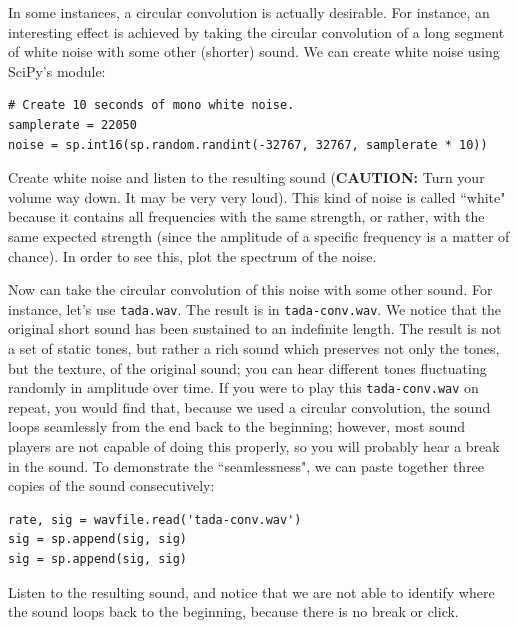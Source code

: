 In some instances, a circular convolution is actually desirable.
For instance, an interesting effect is achieved by taking the circular convolution of a long segment of white noise with some other (shorter) sound.
We can create white noise using SciPy's  module:
\begin{lstlisting}
# Create 10 seconds of mono white noise.
samplerate = 22050
noise = sp.int16(sp.random.randint(-32767, 32767, samplerate * 10))
\end{lstlisting}

\begin{problem}
Create white noise and listen to the resulting sound (\textbf{CAUTION:} Turn your volume way down. It may be very very loud). 
This kind of noise is called ``white" because it contains all frequencies with the same strength, or rather, with the same expected strength (since the amplitude of a specific frequency is a matter of chance).
In order to see this, plot the spectrum of the noise.
\end{problem}

Now can take the circular convolution of this noise with some other sound.
For instance, let's use \texttt{tada.wav}.
The result is in \texttt{tada-conv.wav}.
We notice that the original short sound has been sustained to an indefinite length.
The result is not a set of static tones, but rather a rich sound which preserves not only the tones, but the texture, of the original sound; you can hear different tones fluctuating randomly in amplitude over time.
If you were to play this \texttt{tada-conv.wav} on repeat, you would find that, because we used a circular convolution, the sound loops seamlessly from the end back to the beginning; however, most sound players are not capable of doing this properly, so you will probably hear a break in the sound. To demonstrate the ``seamlessness", we can paste together three copies of the sound consecutively:

\begin{lstlisting}
rate, sig = wavfile.read('tada-conv.wav')
sig = sp.append(sig, sig)
sig = sp.append(sig, sig)
\end{lstlisting}

Listen to the resulting sound, and notice that we are not able to identify where the sound loops back to the beginning, because there is no break or click.


